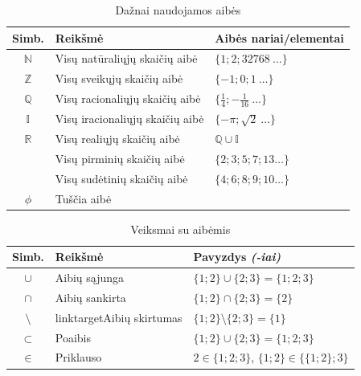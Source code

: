 \documentclass[fleqn]{article} %
\begin{document}
\begin{table}[h]
\begin{tabular}{c|l|l}
    
    Simb. & Reikšmė                                 & Aibės nariai/elementai \\
    \hline
    $\mathbb{N}$ & Visų natūraliųjų skaičių aibė    & $\{1; 2; 32768\:\dots\}$ \\
    $\mathbb{Z}$ & Visų sveikųjų skaičių aibė       & $\{-1; 0; 1\:\dots\}$ \\
    $\mathbb{Q}$ & Visų racionaliųjų skaičių aibė   & $\{\frac{1}{4}; -\frac{1}{16}\:\dots\}$ \\
    $\mathbb{I}$ & Visų iracionaliųjų skaičių aibė  & $\{-\pi; \sqrt{2}\:\dots\}$ \\
    $\mathbb{R}$ & Visų realiųjų skaičių aibė       & $\mathbb{Q} \cup \mathbb{I}$ \\
                 & Visų pirminių skaičių aibė       & $\{2; 3; 5; 7; 13 \dots \}$ \\
                 & Visų sudėtinių skaičių aibė      & $\{4; 6; 8; 9; 10\dots\}$ \\
    $\phi$       & Tuščia aibė                      &
\end{tabular}
\caption[Dažnai naudojamos aibės]{Dažnai naudojamos aibės}
\label{table:data}
\end{table} 

\begin{table}[h]
    \begin{tabular}{c|l|l}
        
        Simb. & Reikšmė                             & Pavyzdys \textit{(-iai)} \\
        \hline
        $\cup$      & Aibių sąjunga                 & $\{1; 2\} \cup \{2; 3\} = \{1; 2; 3\}$ \\
        $\cap$      & Aibių sankirta                & $\{1; 2\} \cap \{2; 3\} = \{2\}$ \\
        $\setminus$ & linktarget{Aibių skirtumas}   & $\{1; 2\} \setminus \{2; 3\} = \{1\}$ \\
        $\subset$   & Poaibis                       & $\{1; 2\} \cup \{2; 3\} = \{1; 2; 3\}$ \\
        $\in$       & Priklauso                     & $2 \in \{1; 2; 3\}$, $\{1; 2\} \in \{\{1; 2\}; 3\}$ \\
    \end{tabular}
    \caption[Veiksmai su aibėmis]{Veiksmai su aibėmis}
\end{table} 
\end{document}
